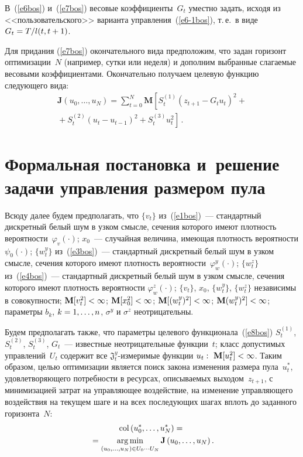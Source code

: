 \begin{multicols}{2}
  
  В~(\ref{e6bos}) и~(\ref{e7bos}) весовые коэффициенты~$G_t$ уместно задать, исходя из 
<<пользовательского>> варианта управления~(\ref{e6-1bos}), т.\,е.\ в 
виде $G_t\hm= T/l(t,t+1)$.
  
  Для придания (\ref{e7bos}) окончательного вида предположим, что задан горизонт 
оптимизации~$N$ (например, сутки или неделя) и дополним выбранные слагаемые 
весовыми коэффициентами. Окончательно получаем целевую функцию следующего вида:
  \begin{multline}
  \mathbf{J}(u_0,\ldots ,u_N)=\sum\limits_{t=0}^N \mathbf{M}\left[ S_t^{(1)}\left( z_{t+1}-
G_t u_t\right)^2+{}\right.\\
\left.{}+S_t^{(2)}\left( u_t-u_{t-1}\right)^2+S_t^{(3)} u_t^2\right]\,.
  \label{e8bos}
  \end{multline}



\section{Формальная постановка и~решение задачи управления размером пула}
  
  Всюду далее будем предполагать, что $\{v_t\}$ из~(\ref{e1bos})~--- стандартный 
дискретный белый шум в узком смысле, сечения которого имеют плот\-ность 
вероятности~$\varphi_v(\cdot)$; $x_0$~--- случайная величина, \mbox{имеющая} плот\-ность 
вероятности $\psi_0(\cdot)$; $\{w_t^y\}$ из~(\ref{e3bos})~--- стандартный дискретный белый 
шум в узком смыс\-ле, сечения которого имеют плотность ве\-ро\-ят\-ности~$\varphi_w^y(\cdot)$; 
$\{w_t^z\}$ из~(\ref{e4bos})~--- стандартный дискретный белый шум в узком смысле, 
сечения которого имеют плот\-ность вероятности $\varphi_w^z(\cdot)$; $\{v_t\}$, $x_0$, 
$\{w_t^y\}$, $\{w_t^z\}$ независимы в совокупности; $\mathbf{M}[v_t^2]\hm<\infty$; 
$\mathbf{M}[x_0^2]\hm<\infty$; $\mathbf{M}[(w_t^y)^2]\hm<\infty$; 
$\mathbf{M}(w_t^y)^2]\hm<\infty$; параметры $b_k$, $k\hm=1, \ldots ,n$, $\sigma^y$ и 
$\sigma^z$ неотрицательны.
  
  Будем предполагать также, что параметры целевого функционала~(\ref{e8bos}) 
$S_t^{(1)}$, $S_t^{(2)}$, $S_t^{(3)}$, $G_t$~--- известные неотрицательные функции~$t$; 
класс допустимых управлений~$U_t$ содержит все $\mathfrak{J}_t^y$-из\-ме\-ри\-мые функции 
$u_t:\ \mathbf{M}[u_t^2]\hm<\infty$. Таким образом, целью оптимизации является поиск 
закона изменения размера пула~$u_t^*$, удовлетворяющего потребности в ресурсах, 
описываемых выходом~$z_{t+1}$, с минимизацией затрат на управляющее воздействие, на 
изменение управляющего воздействия на текущем шаге и на всех последующих шагах 
вплоть до заданного горизонта~$N$:
  \begin{multline}
\mathrm{col} \left( u_0^*, \ldots ,u_N^*\right) ={}\\
  {}=\mathop{\mathrm{arg}\,\mathrm{min}}\limits_{(u_0,\ldots , u_N)\in U_0 \cdots U_N} 
\mathbf{J}\left( u_0,\ldots ,u_N\right).
  \label{e9bos}
  \end{multline}
  

\end{multicols}
